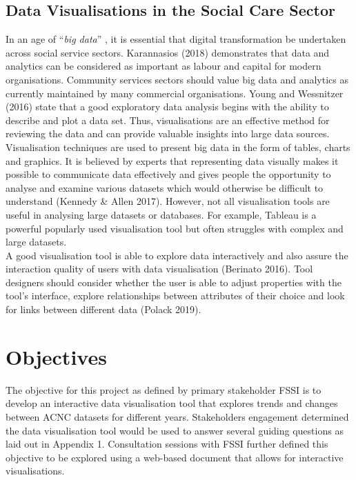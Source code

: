 \documentclass[
  11pt,
]{article}
\begin{document}
\hypertarget{data-visualisations-in-the-social-care-sector}{%
\subsection{Data Visualisations in the Social Care Sector}\label{data-visualisations-in-the-social-care-sector}}

In an age of ``\emph{big data}'' , it is essential that digital transformation be undertaken across social service sectors. Karannasios (2018) demonstrates that data and analytics can be considered as important as labour and capital for modern organisations. Community services sectors should value big data and analytics as currently maintained by many commercial organisations. Young and Wessnitzer (2016) state that a good exploratory data analysis begins with the ability to describe and plot a data set. Thus, visualisations are an effective method for reviewing the data and can provide valuable insights into large data sources.\\
Visualisation techniques are used to present big data in the form of tables, charts and graphics. It is believed by experts that representing data visually makes it possible to communicate data effectively and gives people the opportunity to analyse and examine various datasets which would otherwise be difficult to understand (Kennedy \& Allen 2017). However, not all visualisation tools are useful in analysing large datasets or databases. For example, Tableau is a powerful popularly used visualisation tool but often struggles with complex and large datasets.\\
A good visualisation tool is able to explore data interactively and also assure the interaction quality of users with data visualisation (Berinato 2016). Tool designers should consider whether the user is able to adjust properties with the tool's interface, explore relationships between attributes of their choice and look for links between different data (Polack 2019).

\hypertarget{objectives}{%
\section{Objectives}\label{objectives}}

The objective for this project as defined by primary stakeholder FSSI is to develop an interactive data visualisation tool that explores trends and changes between ACNC datasets for different years.
Stakeholders engagement determined the data visualisation tool would be used to answer several guiding questions as laid out in Appendix 1. Consultation sessions with FSSI further defined this objective to be explored using a web-based document that allows for interactive visualisations.
\end{document}
